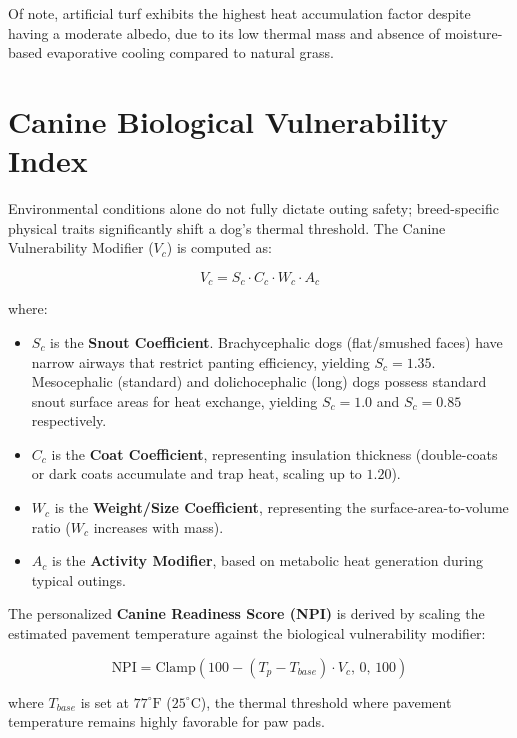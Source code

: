 \documentclass[11pt,twocolumn]{article}
\begin{document}
Of note, artificial turf exhibits the highest heat accumulation factor despite having a moderate albedo, due to its low thermal mass and absence of moisture-based evaporative cooling compared to natural grass.

\section{Canine Biological Vulnerability Index}
Environmental conditions alone do not fully dictate outing safety; breed-specific physical traits significantly shift a dog's thermal threshold. The Canine Vulnerability Modifier ($V_c$) is computed as:

\begin{equation}
V_c = S_c \cdot C_c \cdot W_c \cdot A_c
\end{equation}

where:
\begin{itemize}
  \item $S_c$ is the \textbf{Snout Coefficient}. Brachycephalic dogs (flat/smushed faces) have narrow airways that restrict panting efficiency, yielding $S_c = 1.35$. Mesocephalic (standard) and dolichocephalic (long) dogs possess standard snout surface areas for heat exchange, yielding $S_c = 1.0$ and $S_c = 0.85$ respectively.
  \item $C_c$ is the \textbf{Coat Coefficient}, representing insulation thickness (double-coats or dark coats accumulate and trap heat, scaling up to $1.20$).
  \item $W_c$ is the \textbf{Weight/Size Coefficient}, representing the surface-area-to-volume ratio ($W_c$ increases with mass).
  \item $A_c$ is the \textbf{Activity Modifier}, based on metabolic heat generation during typical outings.
\end{itemize}

The personalized \textbf{Canine Readiness Score (NPI)} is derived by scaling the estimated pavement temperature against the biological vulnerability modifier:

\begin{equation}
\text{NPI} = \text{Clamp}\left(100 - \left(T_p - T_{base}\right) \cdot V_c, \, 0, \, 100\right)
\end{equation}

where $T_{base}$ is set at $77^\circ\text{F}$ ($25^\circ\text{C}$), the thermal threshold where pavement temperature remains highly favorable for paw pads.
\end{document}
